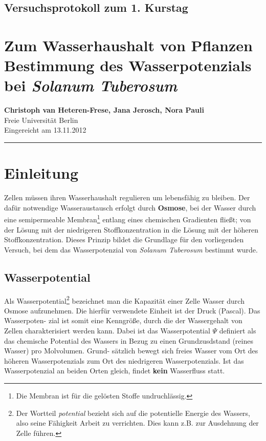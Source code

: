 \documentclass[11pt,a4paper,DIV=10,]{scrartcl}
\begin{document}
\onecolumn
\subsection*{Versuchsprotokoll zum 1. Kurstag }
\section*{Zum Wasserhaushalt von Pflanzen\\Bestimmung des Wasserpotenzials bei \textit{Solanum Tuberosum}}
\textbf{Christoph van Heteren-Frese\footnotemark[1], Jana Jerosch\footnotemark[1], Nora Pauli\footnotemark[1]} \\[0.1cm]
\footnotemark[1]Freie Universität Berlin\\[0.2cm]
Eingereicht am 13.11.2012\\
\hrule

\section*{Einleitung}    
Zellen müssen ihren Wasserhaushalt regulieren um lebensfähig zu bleiben. Der dafür notwendige Wasseraustausch erfolgt durch \textbf{Osmose}, bei der Wasser durch eine semipermeable Membran\footnote{Die Membran ist für die gelösten Stoffe undruchlässig.}  entlang eines chemischen Gradienten fließt; von der Lösung mit der niedrigeren Stoffkonzentration in die Lösung mit der höheren Stoffkonzentration. Dieses Prinzip bildet die Grundlage für den vorliegenden Versuch, bei dem das Wasserpotenzial von \textit{Solanum Tuberosum} bestimmt wurde. 

\subsection*{Wasserpotential}

Als Wasserpotential\footnote{Der Wortteil \textit{potential} bezieht sich auf die potentielle Energie des Wassers, also seine Fähigkeit Arbeit zu verrichten. Dies kann z.B. zur Ausdehnung der Zelle führen.} bezeichnet man die Kapazität einer Zelle Wasser durch Osmose
aufzunehmen. Die hierfür verwendete Einheit ist der Druck (Pascal). Das Wasserpoten-
zial ist somit eine Kenngröße, durch die der Wassergehalt von Zellen charakterisiert
werden kann. Dabei ist das Wasserpotential $\Psi$ definiert als das chemische Potential des
Wassers in Bezug zu einen Grundzusdstand (reines Wasser) pro Molvolumen. Grund-
sätzlich bewegt sich freies Wasser vom Ort des höheren Wasserpotenzials zum Ort des
niedrigeren Wasserpotenzials. Ist das Wasserpotenzial an beiden Orten gleich, findet
\textbf{kein} Wasserfluss statt.
\end{document}

